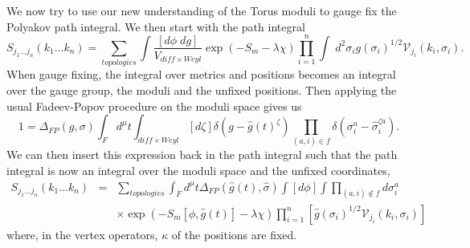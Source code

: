 \documentclass[12pt,letterpaper]{article}
\def\be{\begin{equation}}
\def\ee{\end{equation}}
\def\bear{\begin{eqnarray}}
\def\eear{\end{eqnarray}}
\def\nn{\nonumber}
\begin{document}
We now try to use our new understanding of the Torus moduli to gauge fix the Polyakov path integral.  We then start with the path integral
\be
S_{j_{1}...j_{n}}(k_{1}...k_{n})=\sum_{topologies}\int\frac{[d\phi\;dg]}{V_{diff\times Weyl}}\exp(-S_{m}-\lambda\chi)\prod_{i=1}^{n}\int\;d^{2}\sigma_{i}g(\sigma_{i})^{1/2}\mathcal{V}_{j_{i}}(k_{i},\sigma_{i}).
\ee
When gauge fixing, the integral over metrics and positions becomes an integral over the gauge group, the moduli and the unfixed positions.  Then applying the usual Fadeev-Popov procedure on the moduli space gives us
\be\label{FP}
1=\Delta_{FP}(g,\sigma)\int_{F}d^{\mu}t\int_{diff\times Weyl}[d\zeta]\delta(g-\hat{g}(t)^{\zeta})\prod_{(a,i)\in f}\delta(\sigma_{i}^{a}-\hat{\sigma}_{i}^{\zeta a}).
\ee
We can then insert this expression back in the path integral such that the path integral is now an integral over the moduli space and the unfixed coordinates,
\bear\label{path}
S_{j_{1}...j_{n}}(k_{1}...k_{n})&=&\sum_{topologies}\int_{F}d^{\mu}t\Delta_{FP}(\hat{g}(t),\hat{\sigma})\int [d\phi]\int\prod_{(a,i)\not\in f}d\sigma_{i}^{a}\nn\\
&&\times \exp(-S_{m}[\phi,\hat{g}(t)]-\lambda\chi)\prod_{i=1}^{n}\left[\hat{g}(\sigma_{i})^{1/2}\mathcal{V}_{j_{i}}(k_{i},\sigma_{i})\right]
\eear
where, in the vertex operators, $\kappa$ of the positions are fixed.
\end{document}
